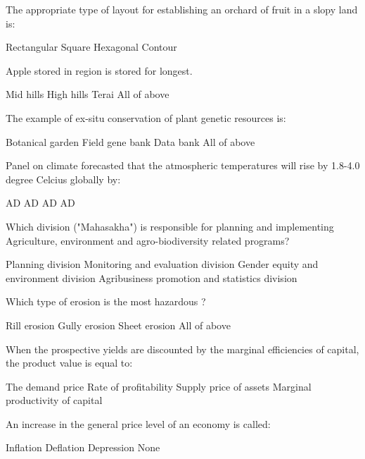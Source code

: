 \begin{questions}
\question The appropriate type of layout for establishing an orchard of fruit in a slopy land is:
  \begin{choices}
  \choice Rectangular
  \choice Square
  \choice Hexagonal
  \choice Contour
  \end{choices}

\question Apple stored in \fillin[][3cm] region is stored for longest.
  \begin{choices}
  \choice Mid hills
  \choice High hills
  \choice Terai
  \choice All of above
  \end{choices}

\question The example of ex-situ conservation of plant genetic resources is:
  \begin{choices}
  \choice Botanical garden
  \choice Field gene bank
  \choice Data bank
  \choice All of above
  \end{choices}

\question Panel on climate forecasted that the atmospheric temperatures will rise by 1.8-4.0 degree Celcius globally by:
  \begin{choices}
   AD
   AD
   AD
   AD
  \end{choices}

\question Which division ("Mahasakha") is responsible for planning and implementing Agriculture, environment and agro-biodiversity related programs?
  \begin{choices}
  \choice Planning division
  \choice Monitoring and evaluation division
  \choice Gender equity and environment division
  \choice Agribusiness promotion and statistics division
  \end{choices}

\question Which type of erosion is the most hazardous ?
  \begin{choices}
  \choice Rill erosion
  \choice Gully erosion
  \choice Sheet erosion
  \choice All of above
  \end{choices}

\question When the prospective yields are discounted by the marginal efficiencies of capital, the product value is equal to:
  \begin{choices}
  \choice The demand price
  \choice Rate of profitability
  \choice Supply price of assets
  \choice Marginal productivity of capital
  \end{choices}

\question An increase in the general price level of an economy is called:
  \begin{choices}
  \choice Inflation
  \choice Deflation
  \choice Depression
  \choice None
  \end{choices}


\end{questions}
